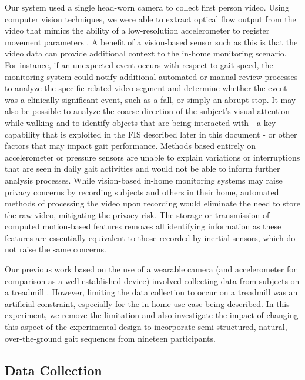 \documentclass[12pt]{report}
\begin{document}
Our system used a single head-worn camera to collect first person video. Using computer vision techniques, we were able to extract optical flow output from the video that mimics the ability of a low-resolution accelerometer to register movement parameters \cite{Schneider2017PreliminaryProcessing}. A benefit of a vision-based sensor such as this is that the video data can provide additional context to the in-home monitoring scenario. For instance, if an unexpected event occurs with respect to gait speed, the monitoring system could notify additional automated or manual review processes to analyze the specific related video segment and determine whether the event was a clinically significant event, such as a fall, or simply an abrupt stop. It may also be possible to analyze the coarse direction of the subject's visual attention while walking and to identify objects that are being interacted with - a key capability that is exploited in the FIS described later in this document - or other factors that may impact gait performance. Methods based entirely on accelerometer or pressure sensors are unable to explain variations or interruptions that are seen in daily gait activities and would not be able to inform further analysis processes. While vision-based in-home monitoring systems may raise privacy concerns by recording subjects and others in their home, automated methods of processing the video upon recording would eliminate the need to store the raw video, mitigating the privacy risk. The storage or transmission of computed motion-based features removes all identifying information as these features are essentially equivalent to those recorded by inertial sensors, which do not raise the same concerns.

Our previous work based on the use of a wearable camera (and accelerometer for comparison as a well-established device) involved collecting data from subjects on a treadmill \cite{Schneider2017}. However, limiting the data collection to occur on a treadmill was an artificial constraint, especially for the in-home use-case being described. In this experiment, we remove the limitation and also investigate the impact of changing this aspect of the experimental design to incorporate semi-structured, natural, over-the-ground gait sequences from nineteen participants.

\subsection{Data Collection}
\end{document}

